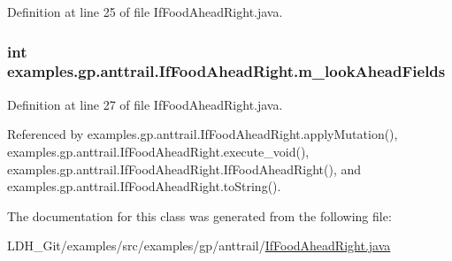 Definition at line 25 of file If\-Food\-Ahead\-Right.\-java.

\hypertarget{classexamples_1_1gp_1_1anttrail_1_1_if_food_ahead_right_ae45e232ac44cd8a9ae235aaba5797b4f}{
\subsubsection[{m\-\_\-look\-Ahead\-Fields}]{\setlength{\rightskip}{0pt plus 5cm}int examples.\-gp.\-anttrail.\-If\-Food\-Ahead\-Right.\-m\-\_\-look\-Ahead\-Fields\hspace{0.3cm}{\ttfamily [private]}}}\label{classexamples_1_1gp_1_1anttrail_1_1_if_food_ahead_right_ae45e232ac44cd8a9ae235aaba5797b4f}


Definition at line 27 of file If\-Food\-Ahead\-Right.\-java.



Referenced by examples.\-gp.\-anttrail.\-If\-Food\-Ahead\-Right.\-apply\-Mutation(), examples.\-gp.\-anttrail.\-If\-Food\-Ahead\-Right.\-execute\-\_\-void(), examples.\-gp.\-anttrail.\-If\-Food\-Ahead\-Right.\-If\-Food\-Ahead\-Right(), and examples.\-gp.\-anttrail.\-If\-Food\-Ahead\-Right.\-to\-String().



The documentation for this class was generated from the following file\-:\begin{DoxyCompactItemize}
\item 
L\-D\-H\-\_\-\-Git/examples/src/examples/gp/anttrail/\hyperlink{_if_food_ahead_right_8java}{If\-Food\-Ahead\-Right.\-java}\end{DoxyCompactItemize}

